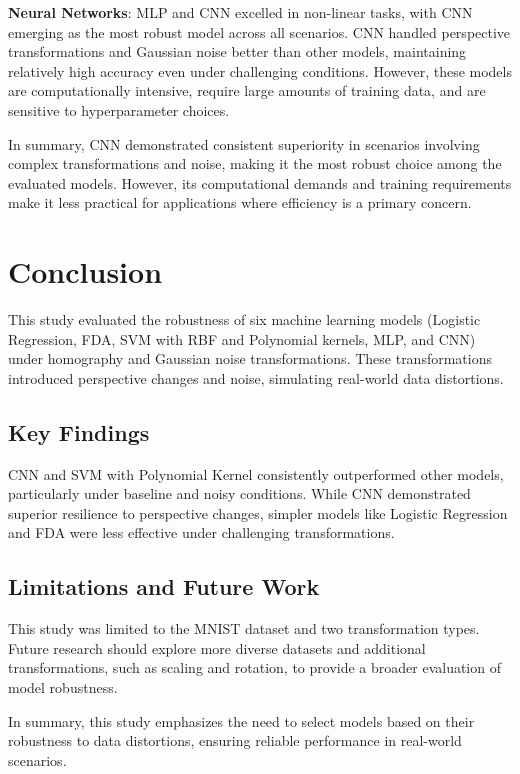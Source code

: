 \documentclass{article}
\begin{document}
\textbf{Neural Networks}: MLP and CNN excelled in non-linear tasks, with CNN emerging as the most robust model across all scenarios. CNN handled perspective transformations and Gaussian noise better than other models, maintaining relatively high accuracy even under challenging conditions. However, these models are computationally intensive, require large amounts of training data, and are sensitive to hyperparameter choices.

In summary, CNN demonstrated consistent superiority in scenarios involving complex transformations and noise, making it the most robust choice among the evaluated models. However, its computational demands and training requirements make it less practical for applications where efficiency is a primary concern.

\section{Conclusion}

This study evaluated the robustness of six machine learning models (Logistic Regression, FDA, SVM with RBF and Polynomial kernels, MLP, and CNN) under homography and Gaussian noise transformations. These transformations introduced perspective changes and noise, simulating real-world data distortions.

\subsection*{Key Findings}
CNN and SVM with Polynomial Kernel consistently outperformed other models, particularly under baseline and noisy conditions. While CNN demonstrated superior resilience to perspective changes, simpler models like Logistic Regression and FDA were less effective under challenging transformations.

\subsection*{Limitations and Future Work}
This study was limited to the MNIST dataset and two transformation types. Future research should explore more diverse datasets and additional transformations, such as scaling and rotation, to provide a broader evaluation of model robustness.

In summary, this study emphasizes the need to select models based on their robustness to data distortions, ensuring reliable performance in real-world scenarios.
\end{document}
